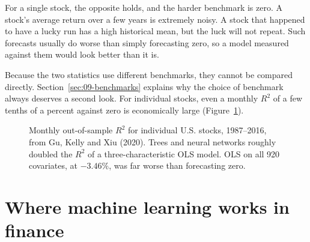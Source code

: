 For a single stock, the opposite holds, and the harder benchmark is zero. A stock's average return over a few years is extremely noisy. A stock that happened to have a lucky run has a high historical mean, but the luck will not repeat. Such forecasts usually do worse than simply forecasting zero, so a model measured against them would look better than it is.

Because the two statistics use different benchmarks, they cannot be compared directly. Section~\ref{sec:09-benchmarks} explains why the choice of benchmark always deserves a second look. For individual stocks, even a monthly $R^2$ of a few tenths of a percent against zero is economically large (Figure~\ref{fig:20-gkx}).

\begin{figure}[htbp]
\centering
{}
\caption{Monthly out-of-sample $R^2$ for individual U.S. stocks, 1987--2016, from Gu, Kelly and Xiu (2020). Trees and neural networks roughly doubled the $R^2$ of a three-characteristic OLS model. OLS on all 920 covariates, at $-3.46\%$, was far worse than forecasting zero.}
\label{fig:20-gkx}
\end{figure}

\section{Where machine learning works in finance}
\label{sec:20-applications}

